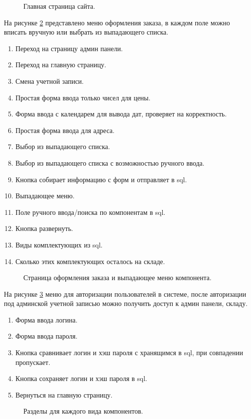 \begin{figure}[ht]
\caption{Главная страница сайта.}
\label{index:image}
\end{figure}

\newpage 
На рисунке \ref{main:image} представлено меню оформления заказа,  в каждом поле можно вписать вручную или выбрать из выпадающего списка.
\begin{enumerate}
	\item Переход на страницу админ панели.
	\item Переход на главную страницу.
	\item Смена учетной записи.
	\item Простая форма ввода только чисел для цены.
	\item Форма ввода с календарем для вывода дат, проверяет на корректность.
	\item Простая форма ввода для адреса.
	\item Выбор из выпадающего списка.
	\item Выбор из выпадающего списка с возможностью ручного ввода.
	\item Кнопка собирает информацию с форм и отправляет в sql.
	\item Выпадающее меню.
	\item Поле ручного ввода/поиска по компонентам в sql.
	\item Кнопка развернуть.
	\item Виды комплектующих из sql.
	\item Сколько этих комплектующих осталось на складе.
\end{enumerate}

\begin{figure}[H]
\caption{Страница оформления заказа и выпадающее меню компонента.}
\label{main:image}
\end{figure}

На рисунке \ref{login:image} меню для авторизации пользователей в системе, после авторизации под админской учетной записью можно получить доступ к админ панели, складу.
\begin{enumerate}
	\item Форма ввода логина.
	\item Форма ввода пароля.
	\item Кнопка сравнивает логин и хэш пароля с хранящимся в sql, при совпадении пропускает.
	\item Кнопка сохраняет логин и хэш пароля в sql.
	\item Вернуться на главную страницу.
\end{enumerate}
\begin{figure}[ht]
	\caption{Разделы для каждого вида компонентов.}
	\label{login:image}
\end{figure}

